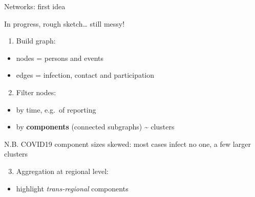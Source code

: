 \documentclass[
  8pt,
  ignorenonframetext,
]{beamer}
\providecommand{\tightlist}{%
  \setlength{\itemsep}{0pt}\setlength{\parskip}{0pt}}
\begin{document}
\begin{frame}{Networks: first idea}
\protect\hypertarget{networks-first-idea}{}
\small

In progress, rough sketch\ldots{} still messy!

\vspace{0.25cm}

\begin{enumerate}
\tightlist
\item
  Build graph:
\end{enumerate}

\begin{itemize}
\tightlist
\item
  nodes = persons and events
\item
  edges = infection, contact and participation
\end{itemize}

\vspace{0.25cm}

\begin{enumerate}
\setcounter{enumi}{1}
\tightlist
\item
  Filter nodes:
\end{enumerate}

\begin{itemize}
\tightlist
\item
  by time, e.g.~of reporting
\item
  by \textbf{components} (connected subgraphs) \textasciitilde{}
  clusters
\end{itemize}

\normalsize

\tiny

N.B. COVID19 component sizes skewed: most cases infect no one, a few
larger clusters \normalsize

\vspace{0.25cm}

\small

\begin{enumerate}
\setcounter{enumi}{2}
\tightlist
\item
  Aggregation at regional level:
\end{enumerate}

\begin{itemize}
\tightlist
\item
  highlight \emph{trans-regional} components
\end{itemize}

\vspace{0.25cm}


\end{frame}
\end{document}
